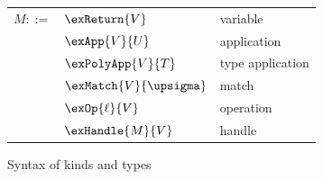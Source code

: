 \begin{figure}
{\begin{minipage}[t]{0.50\textwidth}
\begin{tabularx}{\textwidth}{rL{3.9cm}L{3cm}}
         $M ::=$
         &
         $\exReturn{V}$
         &
         variable
         \\
         &
         $\exApp{V}{U}$
         &
         application
         \\
         &
         $\exPolyApp{V}{T}$
         &
         type application
         \\
         &
         $\exMatch{V}{\upsigma}$
         &
         match
         \\
         &
         $\exOp{\ell}{V}$
         &
         operation
         \\
         &
         $\exHandle{M}{V}$
         &
         handle
      \end{tabularx}
   \end{minipage}
   }
   \caption{Syntax of kinds and types}
\end{figure}
